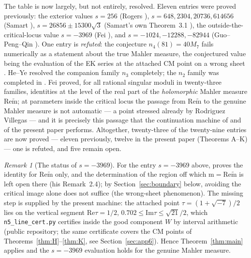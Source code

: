 \documentclass[11pt]{article}
\newcommand{\m}{\mathrm{m}}                 %
\newcommand{\mt}{\widetilde{\mathrm{m}}}    %
\newcommand{\ReT}{\mathrm{Re}}
\newcommand{\ImT}{\mathrm{Im}}
\theoremstyle{definition}
\theoremstyle{remark}
\newtheorem{remark}[theorem]{Remark}
\begin{document}
The table is now largely, but not entirely, resolved. Eleven entries
were proved previously: the exterior values $s=256$ (Rogers
\cite{Ro}), $s=648,2304,20736,614656$ (Samart \cite{Sa13}),
$s=26856\pm15300\sqrt3$ (Samart's own Theorem~3.1 \cite{Sa15}), the
outside-the-critical-locus value $s=-3969$ (Fei \cite{Fei}), and
$s=-1024,-12288,-82944$ (Guo--Peng--Qin \cite{GPQ}). One entry is
\emph{refuted}: the conjecture $n_4(81)=40M_7$ fails numerically as a
statement about the true Mahler measure, the conjectured value being
the evaluation of the EK series at the attached CM point on a wrong
sheet \cite{Zf2}. He--Ye \cite{HY} resolved the companion family
$n_3$ completely; the $n_2$ family was completed in \cite{Zf,ZGQ,GPQ}.
Fei \cite{Fei} proved, for all rational singular moduli in twenty-three
families, identities at the level of the real part of the
\emph{holomorphic} Mahler measure $\ReT\mt$; at parameters inside the
critical locus the passage from $\ReT\mt$ to the genuine Mahler
measure is not automatic --- a point stressed already by Rodriguez
Villegas \cite{RV} --- and it is precisely this passage that the
continuation machine of \cite{Zf} and of the present paper performs.
Altogether, twenty-three of the twenty-nine entries are now proved
--- eleven previously, twelve in the present paper
(Theorems A--K) --- one is refuted, and five
remain open.

\begin{remark}[The status of $s=-3969$]\label{rem:fei}
For the entry $s=-3969$ above, \cite{Fei} proves the identity for
$\ReT\mt$ only, and the determination of the region off which
$\m=\ReT\mt$ is left open there (his Remark~2.4); by
Section~\ref{sec:boundary} below, avoiding the critical image alone
does not suffice (the wrong-sheet phenomenon). The missing step is
supplied by the present machine: the attached point
$\tau=(1+\sqrt{-7})/2$ lies on the vertical segment
$\ReT\tau=1/2$, $0.702\le\ImT\tau\le\sqrt{21}/2$, which
\texttt{n5\_line\_cert.py} certifies inside the good component $W$
by interval arithmetic (public repository; the same certificate
covers the CM points of Theorems~\ref{thm:H}--\ref{thm:K}, see
Section~\ref{sec:app6}). Hence
Theorem~\ref{thm:main} applies and the $s=-3969$ evaluation holds
for the genuine Mahler measure.
\end{remark}
\end{document}
